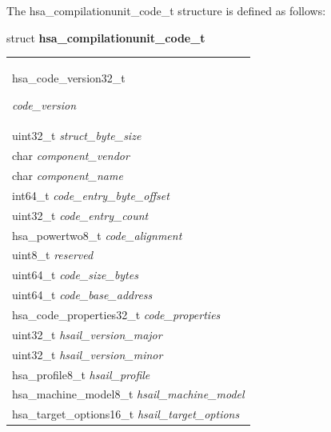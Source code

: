 \documentclass{book}
\newcommand{\hsaarg}[1]{\textit{#1}}
\newcommand{\hsadef}[2]{\hypertarget{#1}{\textbf{#2}}}
\newcommand{\hsatyp}[2]{\hypertarget{#1}{#2}}
\newcommand{\reftyp}[1]{#1}
\begin{document}
\begin{appendices}
The \reftyp{hsa\_compilationunit\_code\_t} structure is defined as
follows:
\makeatletter{}

\noindent\begin{tcolorbox}[breakable,nobeforeafter,arc=0mm,colframe=white,colback=lightgray,left=0mm]
struct \hsadef{group__compilationunit_1ga4d6e1e1933c536078944309a71c0d072}{hsa\_compilationunit\_code\_t}
\vspace{-3.5mm}\begin{longtable}{@{}p{\textwidth}}
\hspace{1.7em}\hsatyp{group__codeversion_1ga2e5641a9c81f06d5e775848dcfb60c23}{hsa\_code\_version32\_t} \hsaarg{code\_version}\\
\hspace{1.7em}uint32\_t \hsaarg{struct\_byte\_size}\\
\hspace{1.7em}char \hsaarg{component\_vendor}\\
\hspace{1.7em}char \hsaarg{component\_name}\\
\hspace{1.7em}int64\_t \hsaarg{code\_entry\_byte\_offset}\\
\hspace{1.7em}uint32\_t \hsaarg{code\_entry\_count}\\
\hspace{1.7em}hsa\_powertwo8\_t \hsaarg{code\_alignment}\\
\hspace{1.7em}uint8\_t \hsaarg{reserved}\\
\hspace{1.7em}uint64\_t \hsaarg{code\_size\_bytes}\\
\hspace{1.7em}uint64\_t \hsaarg{code\_base\_address}\\
\hspace{1.7em}hsa\_code\_properties32\_t \hsaarg{code\_properties}\\
\hspace{1.7em}uint32\_t \hsaarg{hsail\_version\_major}\\
\hspace{1.7em}uint32\_t \hsaarg{hsail\_version\_minor}\\
\hspace{1.7em}hsa\_profile8\_t \hsaarg{hsail\_profile}\\
\hspace{1.7em}hsa\_machine\_model8\_t \hsaarg{hsail\_machine\_model}\\
\hspace{1.7em}hsa\_target\_options16\_t \hsaarg{hsail\_target\_options}
\end{longtable}


\end{tcolorbox}
\end{appendices}
\end{document}
